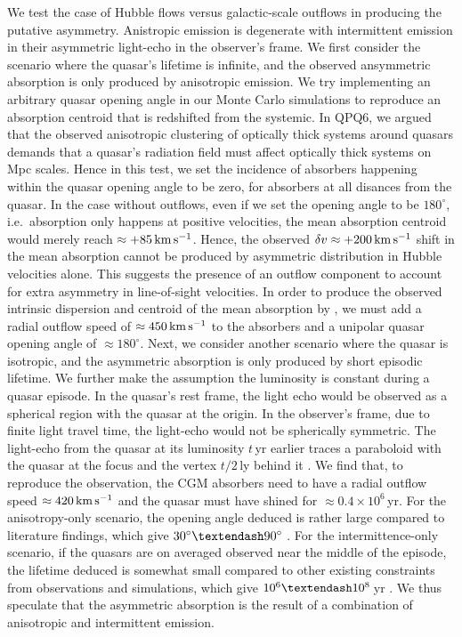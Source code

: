 \documentclass[iop]{emulateapj}
\begin{document}
We test the case of Hubble flows versus galactic-scale outflows in producing the putative
asymmetry.
Anistropic emission is degenerate with intermittent emission in their asymmetric
light-echo in the observer's frame. We first consider the scenario where
the quasar's lifetime is infinite, and the observed ansymmetric absorption is only produced by
anisotropic emission.
We try implementing an arbitrary quasar opening angle in our Monte Carlo simulations to
reproduce an absorption centroid that is redshifted from the systemic. In QPQ6, we argued that
the observed anisotropic clustering of optically thick systems around quasars demands that a quasar's
radiation field must affect optically thick systems on Mpc scales. Hence in this test, we set the
incidence of absorbers happening within the quasar opening angle to be zero, for absorbers at all
disances from the quasar. In the case without
outflows, even if we set the opening angle to be $180^\circ$, i.e.\ absorption only happens at
positive velocities, the mean absorption centroid would merely reach $\approx+85\,{\rm km\,s^{-1}}$.
Hence, the observed $\delta v\approx+200\,{\rm km\,s^{-1}}$ shift in the mean absorption cannot be
produced by asymmetric distribution in Hubble velocities alone. This suggests the presence of an
outflow component to account for extra asymmetry in line-of-sight velocities.
In order to produce the observed intrinsic dispersion and centroid of the mean absorption by
, we must add a radial outflow speed of $\approx450\,{\rm km\,s^{-1}}$ to the absorbers
and a unipolar quasar opening angle of $\approx180^\circ$.
Next, we consider another scenario where the quasar is isotropic, and the asymmetric absorption
is only produced by short episodic lifetime. We further make the assumption the luminosity is
constant during a quasar episode. In the quasar's rest frame, the light echo
would be observed as a spherical region with the quasar at the origin. In the observer's frame, due
to finite light travel time, the light-echo would not be spherically symmetric. The
light-echo from the quasar at its luminosity $t$\,yr earlier traces a paraboloid
with the quasar at the focus and the vertex $t/2$\,ly behind it \citep{Adelberger04,VisbalCroft08}.
We find that, to reproduce the observation, the CGM absorbers need to have a radial outflow speed
$\approx420\,{\rm km\,s^{-1}}$ and the quasar must have shined for $\approx0.4\times10^6$\,yr.
For the anisotropy-only scenario, the opening angle deduced is rather large compared to literature
findings, which give $30^\circ\textendash90^\circ$ \citep[e.g.,][]{TrainorSteidel13,Borisova+16}.
For the intermittence-only scenario, if the quasars are on
averaged observed near the middle of the episode, the lifetime deduced is somewhat small compared
to other existing constraints from observations and simulations, which give
$10^6\textendash10^8$\,yr \citep[e.g.,][]{Martini04,Hopkins+05}.
We thus speculate that the asymmetric absorption is the result of a combination of anisotropic
and intermittent emission.
\end{document}
